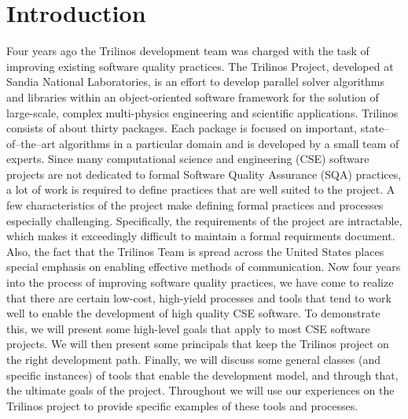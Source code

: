 \documentclass[12pt,relax]{article}
\begin{document}

\section{Introduction}
\label{Section:Introduction}


Four years ago the Trilinos development team was charged with the task of 
improving existing software quality practices.  The Trilinos Project, 
developed at Sandia National Laboratories, is an effort to develop parallel
solver algorithms and libraries within an object-oriented software framework 
for the solution of large-scale, complex multi-physics engineering and 
scientific applications.  Trilinos consists of about thirty packages.  Each 
package is focused on important, state--of--the--art algorithms in a particular 
domain and is developed by a small team of experts.  Since many computational 
science and engineering (CSE) software projects are not dedicated to formal
Software Quality Assurance (SQA) practices, a lot of work is required to 
define practices that are well suited to the project.  A few characteristics 
of the project make defining formal practices and processes especially 
challenging.  Specifically, the requirements of the project are intractable,
which makes it exceedingly difficult to maintain a formal requirments document.
Also, the fact that the Trilinos Team is spread across the United States places
special emphasis on enabling effective methods of communication.
Now four years into the process of improving software quality practices, 
we have come to realize that 
there are certain low-cost, high-yield processes and tools that tend to work 
well to enable the development of high quality CSE software.  To demonstrate 
this, we will present some high-level goals that 
apply to most CSE software projects.  We will then present some principals that
keep the Trilinos project on the right development path.
Finally, we will discuss some general classes (and specific
instances) of tools that enable the development model, and through that, 
the ultimate goals of the project.  Throughout we will use our experiences on 
the Trilinos project to provide specific examples of these tools and processes.
\end{document}

